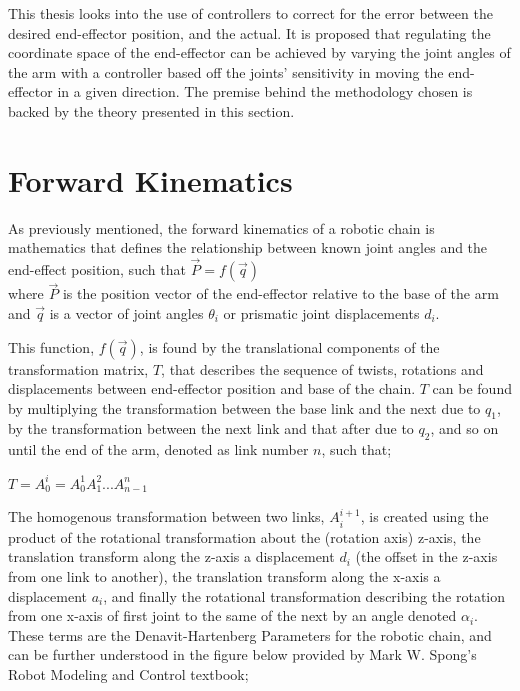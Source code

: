 \documentclass[12pt,openany,a4paper]{book}
\begin{document}
This thesis looks into the use of controllers to correct for the error between the desired end-effector position, and the actual. It is proposed that regulating the coordinate space of the end-effector can be achieved by varying the joint angles of the arm with a controller based off the joints' sensitivity in moving the end-effector in a given direction. The premise behind the methodology chosen is backed by the theory presented in this section.\\


\section{Forward Kinematics}
As previously mentioned, the forward kinematics of a robotic chain is mathematics that defines the relationship between known joint angles and the end-effect position, such that
$\vec{P} = f( \vec{q} )$ \\
where $\vec{P}$ is the position vector of the end-effector relative to the base of the arm and $\vec{q}$ is a vector of joint angles $\theta_i$ or prismatic joint displacements $d_i$.

This function, $f(\vec{q})$, is found by the translational components of the transformation matrix, $T$, that describes the sequence of twists, rotations and displacements between end-effector position and base of the chain. $T$ can be found by multiplying the transformation between the base link and the next due to $q_1$, by the transformation between the next link and that after due to $q_2$, and so on until the end of the arm, denoted as link number $n$, such that;

$T = A_{0}^i = A_{0}^{1} A_{1}^{2} ... A_{n-1}^n$

The homogenous transformation between two links, $A_{i}^{i+1}$, is created using the product of the rotational transformation about the (rotation axis) z-axis, the translation transform along the z-axis a displacement $d_i$ (the offset in the z-axis from one link to another), the translation transform along the x-axis a displacement $a_i$, and finally the rotational transformation describing the rotation from one x-axis of first joint to the same of the next by an angle denoted $\alpha_i$. These terms are the Denavit-Hartenberg Parameters for the robotic chain, and can be further understood in the figure below provided by Mark W. Spong's Robot Modeling and Control textbook;
\end{document}
